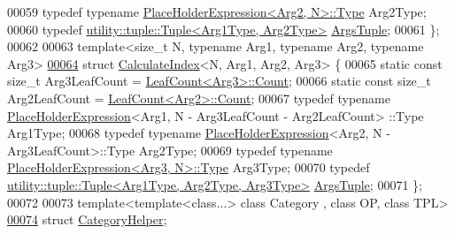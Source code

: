 \begin{DoxyCode}
00059   \textcolor{keyword}{typedef} \textcolor{keyword}{typename} \hyperlink{struct_eigen_1_1_tensor_sycl_1_1internal_1_1_place_holder_expression}{PlaceHolderExpression<Arg2, N>::Type} Arg2Type;
00060   \textcolor{keyword}{typedef} \hyperlink{structutility_1_1tuple_1_1_tuple}{utility::tuple::Tuple<Arg1Type, Arg2Type>} 
      \hyperlink{structutility_1_1tuple_1_1_tuple}{ArgsTuple};
00061 \};
00062 
00063 \textcolor{keyword}{template}<\textcolor{keywordtype}{size\_t} N, \textcolor{keyword}{typename} Arg1, \textcolor{keyword}{typename} Arg2, \textcolor{keyword}{typename} Arg3>
\hyperlink{struct_eigen_1_1_tensor_sycl_1_1internal_1_1_calculate_index_3_01_n_00_01_arg1_00_01_arg2_00_01_arg3_01_4}{00064} \textcolor{keyword}{struct }\hyperlink{struct_eigen_1_1_tensor_sycl_1_1internal_1_1_calculate_index}{CalculateIndex}<N, Arg1, Arg2, Arg3> \{
00065   \textcolor{keyword}{static} \textcolor{keyword}{const} \textcolor{keywordtype}{size\_t} Arg3LeafCount = \hyperlink{struct_eigen_1_1_tensor_sycl_1_1internal_1_1_leaf_count}{LeafCount<Arg3>::Count};
00066   \textcolor{keyword}{static} \textcolor{keyword}{const} \textcolor{keywordtype}{size\_t} Arg2LeafCount = \hyperlink{struct_eigen_1_1_tensor_sycl_1_1internal_1_1_leaf_count}{LeafCount<Arg2>::Count};
00067   \textcolor{keyword}{typedef} \textcolor{keyword}{typename} \hyperlink{struct_eigen_1_1_tensor_sycl_1_1internal_1_1_place_holder_expression}{PlaceHolderExpression}<Arg1, N - Arg3LeafCount - Arg2LeafCount>
      ::Type Arg1Type;
00068   \textcolor{keyword}{typedef} \textcolor{keyword}{typename} \hyperlink{struct_eigen_1_1_tensor_sycl_1_1internal_1_1_place_holder_expression}{PlaceHolderExpression}<Arg2, N - Arg3LeafCount>::Type Arg2Type;
00069   \textcolor{keyword}{typedef} \textcolor{keyword}{typename} \hyperlink{struct_eigen_1_1_tensor_sycl_1_1internal_1_1_place_holder_expression}{PlaceHolderExpression<Arg3, N>::Type} Arg3Type;
00070   \textcolor{keyword}{typedef} \hyperlink{structutility_1_1tuple_1_1_tuple}{utility::tuple::Tuple<Arg1Type, Arg2Type, Arg3Type>}
       \hyperlink{structutility_1_1tuple_1_1_tuple}{ArgsTuple};
00071 \};
00072 
00073 \textcolor{keyword}{template}<\textcolor{keyword}{template}<\textcolor{keyword}{class}...> \textcolor{keyword}{class }Category , \textcolor{keyword}{class }OP, \textcolor{keyword}{class }TPL>
\hyperlink{struct_eigen_1_1_tensor_sycl_1_1internal_1_1_category_helper}{00074} \textcolor{keyword}{struct }\hyperlink{struct_eigen_1_1_tensor_sycl_1_1internal_1_1_category_helper}{CategoryHelper};

\end{DoxyCode}
